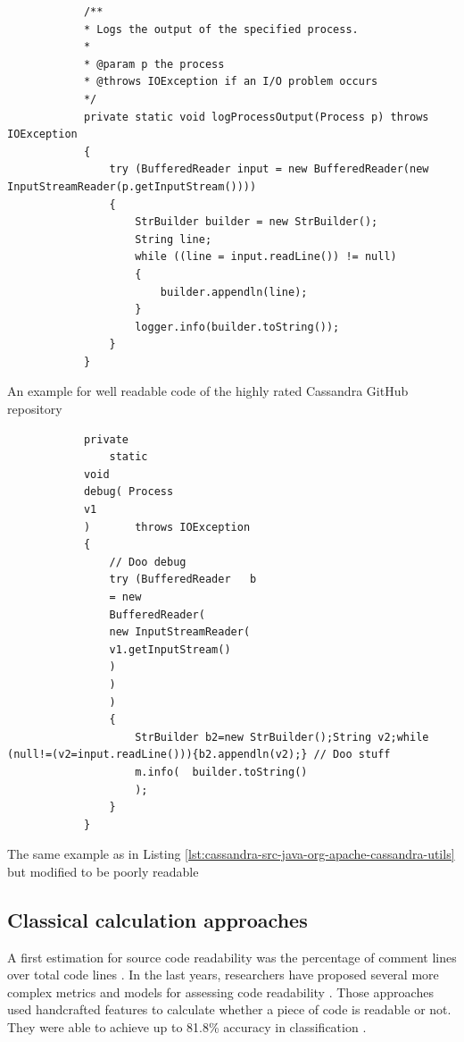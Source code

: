 \documentclass[%
class=scrreprt,
chapterprefix=false,%
open=right,%
twoside=false,%
paper=a4,%
logofile={Logo\_zentral\_farbig\_EN.png},%
thesistype=masterproposal,%
UKenglish,%
]{se2thesis}
\begin{document}
	\begin{listing}[!ht]
		\begin{verbatim}
			/**
			* Logs the output of the specified process.
			*
			* @param p the process
			* @throws IOException if an I/O problem occurs
			*/
			private static void logProcessOutput(Process p) throws IOException
			{
				try (BufferedReader input = new BufferedReader(new InputStreamReader(p.getInputStream())))
				{
					StrBuilder builder = new StrBuilder();
					String line;
					while ((line = input.readLine()) != null)
					{
						builder.appendln(line);
					}
					logger.info(builder.toString());
				}
			}
		\end{verbatim}
		\caption[An example for well readable code of the highly rated Cassandra GitHub repository]{An example for well readable code of the highly rated Cassandra GitHub repository}
		\label{lst:cassandra-src-java-org-apache-cassandra-utils}
	\end{listing}
	
	\begin{listing}[!ht]
		\begin{verbatim}
			private 
				static 
			void 
			debug( Process 
			v1 
			)       throws IOException
			{
				// Doo debug
				try (BufferedReader   b 
				= new 
				BufferedReader(
				new InputStreamReader(
				v1.getInputStream()
				)
				)
				)
				{
					StrBuilder b2=new StrBuilder();String v2;while (null!=(v2=input.readLine())){b2.appendln(v2);} // Doo stuff
					m.info(  builder.toString()
					);
				}
			}
		\end{verbatim}
		\caption{The same example as in Listing \ref{lst:cassandra-src-java-org-apache-cassandra-utils} but modified to be poorly readable}
		\label{lst:cassandra-src-java-org-apache-cassandra-utils-modified}
	\end{listing}
	
%	
%	
%	
	
	\subsection{Classical calculation approaches} \label{Classical calculation approaches}
	A first estimation for source code readability was the percentage of comment lines over total code lines \cite{aggarwal2002integrated}. In the last years, researchers have proposed several more complex metrics and models for assessing code readability \cite{buse2009learning, posnett2011simpler, dorn2012general, scalabrino2016improving}.
	Those approaches used handcrafted features to calculate whether a piece of code is readable or not. They were able to achieve up to 81.8\% accuracy in classification \cite{scalabrino2016improving}.
	
\end{document}
